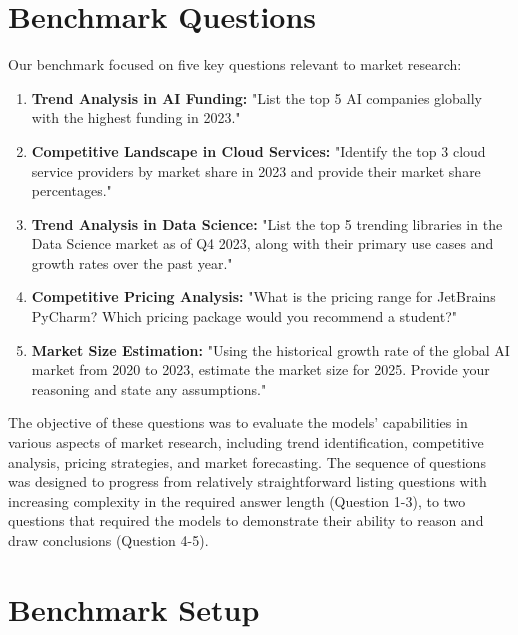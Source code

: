 \documentclass[12pt,a4paper]{article}
\begin{document}
	\section{Benchmark Questions}
	Our benchmark focused on five key questions relevant to market research:
	\begin{enumerate}
		\item \textbf{Trend Analysis in AI Funding:} "List the top 5 AI companies globally with the highest funding in 2023."
		\item \textbf{Competitive Landscape in Cloud Services:} "Identify the top 3 cloud service providers by market share in 2023 and provide their market share percentages."
		\item \textbf{Trend Analysis in Data Science:} "List the top 5 trending libraries in the Data Science market as of Q4 2023, along with their primary use cases and growth rates over the past year."
		\item \textbf{Competitive Pricing Analysis:} "What is the pricing range for JetBrains PyCharm? Which pricing package would you recommend a student?"
		\item \textbf{Market Size Estimation:} "Using the historical growth rate of the global AI market from 2020 to 2023, estimate the market size for 2025. Provide your reasoning and state any assumptions."
	\end{enumerate}
	The objective of these questions was to evaluate the models' capabilities in various aspects of market research, including trend identification, competitive analysis, pricing strategies, and market forecasting. The sequence of questions was designed to progress from relatively straightforward listing questions with increasing complexity in the required answer length (Question 1-3), to two questions that required the models to demonstrate their ability to reason and draw conclusions (Question 4-5). 
	
	\section{Benchmark Setup}
\end{document}
